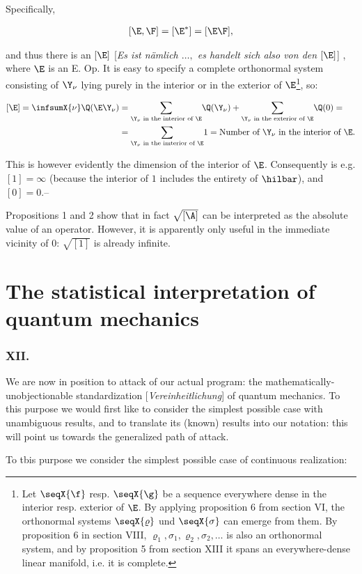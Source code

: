 \documentclass{article}
\newcommand{\WTF}[1]{
[\it{\small{#1}}]
}
\newcommand{\uequ}[1]{
\begin{align*}
#1
\end{align*}
}
\newcommand{\CC}[1]{{#1^{*}}}
\renewcommand{\it}[1]{\textit{#1}}
\newcommand{\sumX}[1]{\underset{#1}{\sum}}
\begin{document}
Specifically,
\uequ{
[\E,\F]=[\CC{\E}] = [\E\F],
}
and thus there is an $[\E]$\WTF{Es ist nämlich $\dots,$ es handelt sich also von den $[\E]$}, where $\E$ is an E. Op. It is easy to specify a complete orthonormal system consisting of $\Y_\nu$ lying purely in the interior or in the exterior of $\E$\footnote{Let $\seqX{\f}$ resp. $\seqX{\g}$ be a sequence everywhere dense in the interior resp. exterior of $\E$. By applying proposition 6 from section VI, the orthonormal systems $\seqX{\varrho}$ und $\seqX{\sigma}$ can emerge from them. By proposition 6 in section VIII, $\varrho_1,\sigma_1,\varrho_2,\sigma_2,\dots$ is also an orthonormal system, and by proposition 5 from section XIII it spans an everywhere-dense linear manifold, i.e. it is complete.}, so:
\uequ{
[\E] = \infsumX{\nu}\Q(\E\Y_\nu) &= \sumX{\text{$\Y_\nu$ in the interior of $\E$}}\Q(\Y_\nu)
                                  + \sumX{\text{$\Y_\nu$ in the exterior of $\E$}}\Q(0) = \\
                                 &= \sumX{\text{$\Y_\nu$ in the imterior of $\E$}}1 =
                                    \text{Number of $\Y_\nu$ in the interior of $\E$}.
}
This is however evidently the dimension of the interior of $\E$. Consequently is e.g. $[1]=\infty$ (because the interior of $1$ includes the entirety of $\hilbar$), and $[0]=0$.--

Propositions 1 and 2 show that in fact $\sqrt{[\A]}$ can be interpreted as the absolute value of an operator. However, it is apparently only useful in the immediate vicinity of $0$: $\sqrt{[1]}$ is already infinite.

\part*{The statistical interpretation of quantum mechanics}
\section*{XII.}
We are now in position to attack of our actual program: the mathematically-unobjectionable standardization\WTF{Vereinheitlichung} of quantum mechanics. To this purpose we would first like to consider the simplest possible case with unambiguous results, and to translate its (known) results into our notation: this will point us towards the generalized path of attack.

To tbis purpose we consider the simplest possible case of continuous realization:
\end{document}
